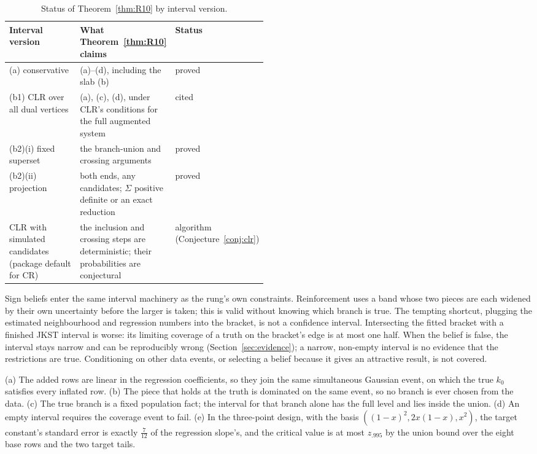 \begin{table}[t]
\centering\small
\begin{tabularx}{\linewidth}{@{}L{0.32\linewidth}Y L{0.17\linewidth}@{}}
\toprule
Interval version & What Theorem~\ref{thm:R10} claims & Status \\
\midrule
(a) conservative & (a)--(d), including the slab (b) & proved \\
(b1) CLR over all dual vertices & (a), (c), (d), under CLR's conditions for the full augmented system & cited \\
(b2)(i) fixed superset & the branch-union and crossing arguments & proved \\
(b2)(ii) projection & both ends, any candidates; $\Sigma$ positive definite or an exact reduction & proved \\
CLR with simulated candidates (package default for CR) & the inclusion and crossing steps are deterministic; their probabilities are conjectural & algorithm (Conjecture~\ref{conj:clr}) \\
\bottomrule
\end{tabularx}
\caption{Status of Theorem~\ref{thm:R10} by interval version.}\label{tab:R10}
\end{table}

\begin{reading}
Sign beliefs enter the same interval machinery as the rung's own constraints.
Reinforcement uses a band whose two pieces are each widened by their own
uncertainty before the larger is taken; this is valid without knowing which branch
is true. The tempting shortcut, plugging the estimated neighbourhood and regression
numbers into the bracket, is not a confidence interval. Intersecting the fitted
bracket with a finished JKST interval is worse: its limiting coverage of a truth on
the bracket's edge is at most one half. When the belief is false, the interval stays
narrow and can be reproducibly wrong (Section~\ref{sec:evidence}); a narrow,
non-empty interval is no evidence that the restrictions are true. Conditioning on
other data events, or selecting a belief because it gives an attractive result, is
not covered.
\end{reading}
\begin{sketch}
(a) The added rows are linear in the regression coefficients, so they join the same
simultaneous Gaussian event, on which the true $k_0$ satisfies every inflated row.
(b) The piece that holds at the truth is dominated on the same event, so no branch
is ever chosen from the data. (c) The true branch is a fixed population fact; the
interval for that branch alone has the full level and lies inside the union.
(d) An empty interval requires the coverage event to fail. (e) In the three-point
design, with the basis $((1-x)^2,2x(1-x),x^2)$, the target constant's standard error
is exactly $\tfrac7{12}$ of the regression slope's, and the critical value is at
most $z_{.995}$ by the union bound over the eight base rows and the two target
tails.
\end{sketch}

